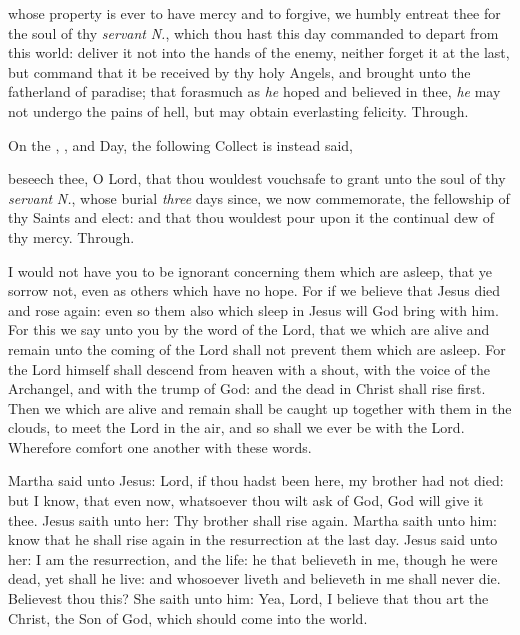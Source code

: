  whose property is ever to have mercy and to forgive, we humbly entreat thee for the soul of thy \textit{servant} \textit{N.}, which thou hast this day commanded to depart from this world: deliver it not into the hands of the enemy, neither forget it at the last, but command that it be received by thy holy Angels, and brought unto the fatherland of paradise; that forasmuch as \textit{he} hoped and believed in thee, \textit{he} may not undergo the pains of hell, but may obtain everlasting felicity. Through.
\begin{rubric}
    On the , , and  Day, the following Collect is instead said,
\end{rubric}
 beseech thee, O Lord, that thou wouldest vouchsafe to grant unto the soul of thy \textit{servant} \textit{N.}, whose burial \textit{three} days since, we now commemorate, the fellowship of thy Saints and elect: and that thou wouldest pour upon it the continual dew of thy mercy. Through.

 I would not have you to be ignorant concerning them which are asleep, that ye sorrow not, even as others which have no hope. For if we believe that Jesus died and rose again: even so them also which sleep in Jesus will God bring with him. For this we say unto you by the word of the Lord, that we which are alive and remain unto the coming of the Lord shall not prevent them which are asleep. For the Lord himself shall descend from heaven with a shout, with the voice of the Archangel, and with the trump of God: and the dead in Christ shall rise first. Then we which are alive and remain shall be caught up together with them in the clouds, to meet the Lord in the air, and so shall we ever be with the Lord. Wherefore comfort one another with these words.

 Martha said unto Jesus: Lord, if thou hadst been here, my brother had not died: but I know, that even now, whatsoever thou wilt ask of God, God will give it thee. Jesus saith unto her: Thy brother shall rise again. Martha saith unto him: know that he shall rise again in the resurrection at the last day. Jesus said unto her: I am the resurrection, and the life: he that believeth in me, though he were dead, yet shall he live: and whosoever liveth and believeth in me shall never die. Believest thou this? She saith unto him: Yea, Lord, I believe that thou art the Christ, the Son of God, which should come into the world.

